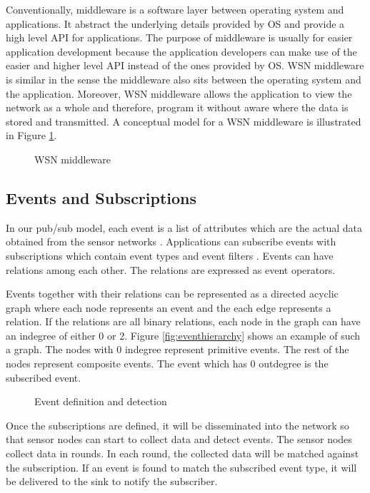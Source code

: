 Conventionally, middleware is a software layer between operating system and applications. It abstract the underlying details provided by OS and provide a high level API for applications. The purpose of middleware is usually for easier application development because the application developers can make use of the easier and higher level API instead of the ones provided by OS. WSN middleware is similar in the sense the middleware also sits between the operating system and the application. Moreover, WSN middleware allows the application to view the network as a whole and therefore, program it without aware where the data is stored and transmitted. A conceptual model for a WSN middleware is illustrated in Figure \ref{fig:middleware}.

\begin{figure}
\centering
{}
\caption{WSN middleware}
\label{fig:middleware}
\end{figure}

\subsection{Events and Subscriptions}
In our pub/sub model, each event is a list of attributes which are the actual data obtained from the sensor networks \cite{lowlevelnaming}. Applications can subscribe events with subscriptions which contain event types \cite{facespubsub} and event filters \cite{siena}. Events can have relations among each other. The relations are expressed as event operators.

Events together with their relations can be represented as a directed acyclic graph where each node represents an event and the each edge represents a relation. If the relations are all binary relations, each node in the graph can have an indegree of either 0 or 2. Figure \ref{fig:eventhierarchy} shows an example of such a graph. The nodes with 0 indegree represent primitive events. The rest of the nodes represent composite events. The event which has 0 outdegree is the subscribed event.

\begin{figure}
\centering
{}
\caption{Event definition and detection}
\label{fig:defndetection}
\end{figure}

Once the subscriptions are defined, it will be disseminated into the network so that sensor nodes can start to collect data and detect events. The sensor nodes collect data in rounds. In each round, the collected data will be matched against the subscription. If an event is found to match the subscribed event type, it will be delivered to the sink to notify the subscriber.

